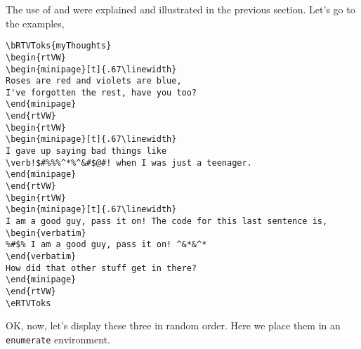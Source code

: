 \documentclass{article}
\let\amtIndent\leftmargini
\begin{document}
The use of  and  were explained and illustrated
in the previous section. Let's go to the examples,
\begin{Verbatim}[xleftmargin=\amtIndent]
\bRTVToks{myThoughts}
\begin{rtVW}
\begin{minipage}[t]{.67\linewidth}
Roses are red and violets are blue,
I've forgotten the rest, have you too?
\end{minipage}
\end{rtVW}
\begin{rtVW}
\begin{minipage}[t]{.67\linewidth}
I gave up saying bad things like
\verb!$#%%%^*%^&#$@#! when I was just a teenager.
\end{minipage}
\end{rtVW}
\begin{rtVW}
\begin{minipage}[t]{.67\linewidth}
I am a good guy, pass it on! The code for this last sentence is,
\begin{verbatim}
%#$% I am a good guy, pass it on! ^&*&^*
\end{verbatim}
How did that other stuff get in there?
\end{minipage}
\end{rtVW}
\eRTVToks
\end{Verbatim}
OK, now, let's display these three in random order. Here we place them in
an \texttt{enumerate} environment.
\end{document}
